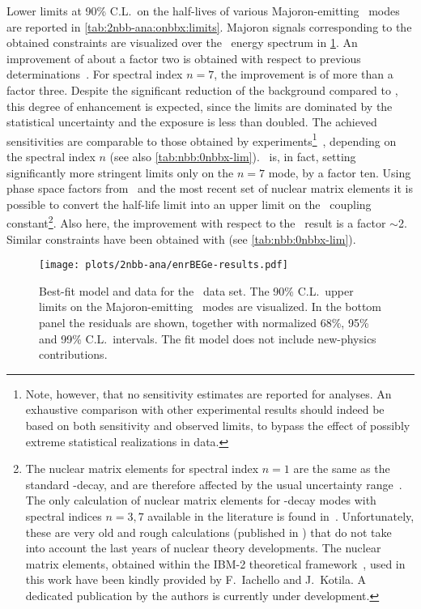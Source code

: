 Lower limits at 90\% C.L.~on the half-lives of various Majoron-emitting \onbb\ modes
are reported in \cref{tab:2nbb-ana:onbbx:limits}. Majoron signals corresponding to the
obtained constraints are visualized over the \enrBEGeII\ energy spectrum in
\cref{fig:2nbb-ana:limits}. An improvement of about a factor two is obtained with respect
to previous determinations~\cite{Agostini2015a}. For spectral index $n=7$, the improvement
is of more than a factor three. Despite the significant reduction of the background
compared to \phaseone, this degree of enhancement is expected, since the limits are dominated
by the statistical uncertainty and the exposure is less than doubled. The achieved
sensitivities are comparable to those obtained by 
experiments\footnote{%
  Note, however, that no sensitivity estimates are reported for  analyses.
  An exhaustive comparison with other experimental results should indeed be based on both
  sensitivity and observed limits, to bypass the effect of possibly extreme statistical
  realizations in data.
}~\cite{Gando2012, Albert2014a}, depending on the spectral index $n$ (see also
\cref{tab:nbb:0nbbx-lim}). \gerda\ is, in fact, setting significantly more stringent
limits only on the $n=7$ mode, by a factor ten.
\newpar
Using phase space factors from~\cite{Kotila2015} and the most recent set of nuclear matrix
elements it is possible to convert the half-life limit into an upper limit on
the \ga\ coupling constant\footnote{%
  The nuclear matrix elements for spectral index $n=1$ are the same as the standard
  \onbb-decay, and are therefore affected by the usual uncertainty range~\cite{Engel2017}.
  The only calculation of nuclear matrix elements for \onbbx-decay modes with spectral
  indices $n=3,7$ available in the literature is found in~\cite{Hirsch1995}.
  Unfortunately, these are very old and rough calculations (published in ) that
  do not take into account the last  years of nuclear theory developments. The
  nuclear matrix elements, obtained within the IBM-2 theoretical
  framework~\cite{Barea2015}, used in this work have been kindly provided by F.~Iachello
  and J.~Kotila. A dedicated publication by the authors is currently under development.
}. Also here, the improvement with respect to the \phaseone\ result is a factor $\sim$2.
Similar constraints have been obtained with  (see \cref{tab:nbb:0nbbx-lim}).

\begin{figure}
  \centering
  \texttt{[image: plots/2nbb-ana/enrBEGe-results.pdf]}
  \caption{%
    Best-fit model and data for the \enrBEGeII\ data set. The 90\% C.L.~upper limits on
    the Majoron-emitting \onbb\ modes are visualized. In the bottom panel the residuals
    are shown, together with normalized 68\%, 95\% and 99\% C.L.~intervals. The fit model
    does not include new-physics contributions.
  }\label{fig:2nbb-ana:limits}
\end{figure}

